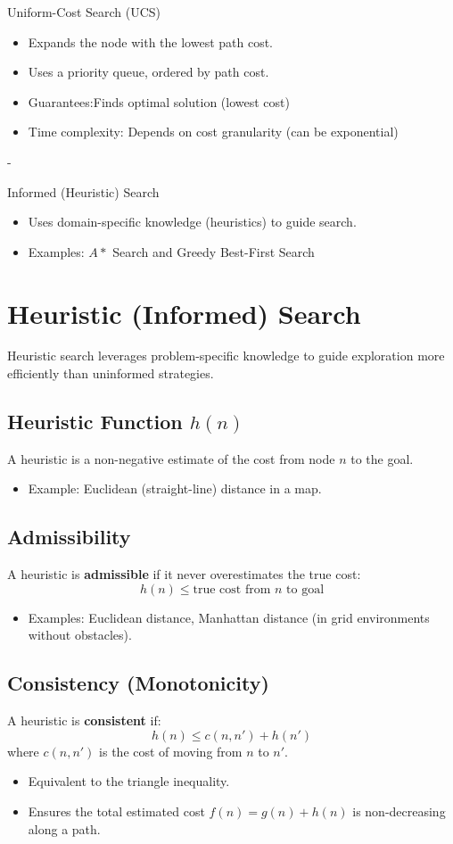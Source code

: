 Uniform-Cost Search (UCS)
\begin{itemize}
    \item Expands the node with the lowest path cost.
    \item Uses a priority queue, ordered by path cost.
    \item Guarantees:Finds optimal solution (lowest cost)
    \item Time complexity: Depends on cost granularity (can be exponential)\\
\end{itemize}
-

Informed (Heuristic) Search
\begin{itemize}
    \item Uses domain-specific knowledge (heuristics) to guide search.
    \item Examples: $A*$ Search and Greedy Best-First Search\\
\end{itemize}


\section{Heuristic (Informed) Search}
Heuristic search leverages problem-specific knowledge to guide exploration more efficiently than uninformed strategies.

\subsection{Heuristic Function $h(n)$}
A heuristic is a non-negative estimate of the cost from node $n$ to the goal.
\begin{itemize}
    \item Example: Euclidean (straight-line) distance in a map.
\end{itemize}

\subsection{Admissibility}
A heuristic is \textbf{admissible} if it never overestimates the true cost:
\[
h(n) \leq \text{true cost from $n$ to goal}
\]
\begin{itemize}
    \item Examples: Euclidean distance, Manhattan distance (in grid environments without obstacles).
\end{itemize}

\subsection{Consistency (Monotonicity)}
A heuristic is \textbf{consistent} if:
\[
h(n) \leq c(n, n') + h(n')
\]
where $c(n, n')$ is the cost of moving from $n$ to $n'$.
\begin{itemize}
    \item Equivalent to the triangle inequality.
    \item Ensures the total estimated cost $f(n) = g(n) + h(n)$ is non-decreasing along a path.
\end{itemize}



